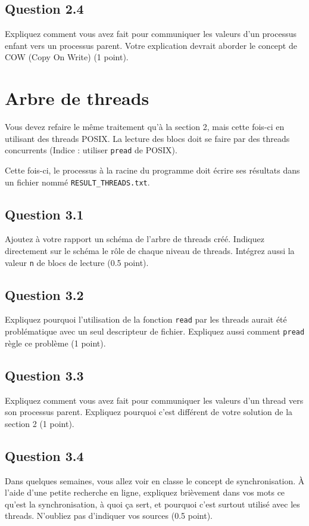 \documentclass[12pt,addpoints]{exam} %
\begin{document}
\subsection*{Question 2.4}
Expliquez comment vous avez fait pour communiquer les valeurs d’un processus enfant vers un processus parent. Votre explication devrait aborder le concept de COW (Copy On Write) (1 point).



\vspace{1cm}
\section{Arbre de threads}
Vous devez refaire le même traitement qu’à la section 2, mais cette fois-ci en utilisant des threads POSIX. La lecture des blocs doit se faire par des threads concurrents (Indice : utiliser \texttt{pread} de POSIX).


Cette fois-ci, le processus à la racine du programme doit écrire ses résultats dans un fichier nommé \texttt{RESULT\_THREADS.txt}.


\subsection*{Question 3.1}
Ajoutez à votre rapport un schéma de l’arbre de threads créé. Indiquez directement sur le schéma le rôle de chaque niveau de threads. Intégrez aussi la valeur \texttt{n} de blocs de lecture (0.5 point).


\subsection*{Question 3.2}
Expliquez pourquoi l’utilisation de la fonction \texttt{read} par les threads aurait été problématique avec un seul descripteur de fichier. Expliquez aussi comment \texttt{pread} règle ce problème (1 point).


\subsection*{Question 3.3}
Expliquez comment vous avez fait pour communiquer les valeurs d’un thread vers son processus parent. Expliquez pourquoi c’est différent de votre solution de la section 2 (1 point).


\subsection*{Question 3.4}
Dans quelques semaines, vous allez voir en classe le concept de synchronisation. À l’aide d’une petite recherche en ligne, expliquez brièvement dans vos mots ce qu’est la synchronisation, à quoi ça sert, et pourquoi c’est surtout utilisé avec les threads. N’oubliez pas d’indiquer vos sources (0.5 point).
\end{document}
